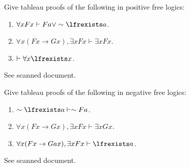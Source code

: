 \documentclass[../../../../include/open-logic-section]{subfiles}
\begin{document}


\begin{prob}
Give tableau proofs of the following in positive free logics:
\begin{enumerate}
\item $\forall xFx\vdash Fa\lor\sim \lfrexists a$.
\item $\forall x(Fx\rightarrow Gx),\exists xFx\vdash\exists xFx$. %
\item $\vdash\forall x\lfrexists x$.
\end{enumerate}
\begin{ans}
See scanned document.
\end{ans}
\end{prob}

\begin{prob}
Give tableau proofs of the following in negative free logics:
\begin{enumerate}
\item $\sim \lfrexists a\vdash\sim Fa$.
\item $\forall x(Fx\rightarrow Gx),\exists xFx\vdash\exists xGx$.
\item $\forall x(Fx\rightarrow Gax),\exists xFx\vdash \lfrexists a$.
\end{enumerate}
\begin{ans}
See scanned document.
\end{ans}
\end{prob}
\end{document}
